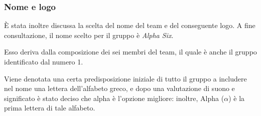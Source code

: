 \documentclass[a4paper, oneside, openany]{article}
\begin{document}
            \subsubsection{Nome e logo}
            È stata inoltre discussa la scelta del nome del team e del conseguente logo. A fine consultazione, il nome scelto
            per il gruppo è \textit{Alpha Six}.\par
            Esso deriva dalla composizione dei sei membri del team, il quale è anche il gruppo identificato dal numero 1.\par
            Viene denotata una certa predisposizione iniziale di tutto il gruppo a includere nel nome una lettera dell'alfabeto greco,
            e dopo una valutazione di suono e significato è stato deciso che alpha è l'opzione migliore: inoltre, Alpha ($\alpha$) è
            la prima lettera di tale alfabeto.
\end{document}
